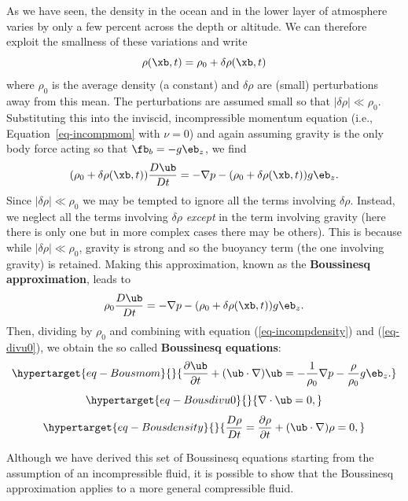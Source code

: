 \documentclass[
  letterpaper,
  twocolumn,
  landscape]{report}
\begin{document}
As we have seen, the density in the ocean and in the lower layer of
atmosphere varies by only a few percent across the depth or altitude. We
can therefore exploit the smallness of these variations and write \[
\rho(\xb,t) = \rho_0 + \delta\rho(\xb,t)
\] where \(\rho_0\) is the average density (a constant) and
\(\delta\rho\) are (small) perturbations away from this mean. The
perturbations are assumed small so that \(|\delta\rho|\ll\rho_0\).
Substituting this into the inviscid, incompressible momentum equation
(i.e., Equation~\ref{eq-incompmom} with \(\nu=0\)) and again assuming
gravity is the only body force acting so that \(\fb_b=-g\eb_z\), we find
\[
(\rho_0 + \delta\rho(\xb,t)) \frac{D\ub}{Dt} = -\nabla p - (\rho_0 + \delta\rho(\xb,t))g\eb_z.
\] Since \(|\delta\rho|\ll\rho_0\) we may be tempted to ignore all the
terms involving \(\delta\rho\). Instead, we neglect all the terms
involving \(\delta\rho\) \emph{except} in the term involving gravity
(here there is only one but in more complex cases there may be others).
This is because while \(|\delta\rho|\ll\rho_0\), gravity is strong and
so the buoyancy term (the one involving gravity) is retained. Making
this approximation, known as the \textbf{Boussinesq approximation},
leads to \[
\rho_0 \frac{D\ub}{Dt} = -\nabla p - (\rho_0 + \delta\rho(\xb,t))g\eb_z.
\] Then, dividing by \(\rho_0\) and combining with equation
(\ref{eq-incompdensity}) and (\ref{eq-divu0}), we obtain the so called
\textbf{Boussinesq equations}:
\begin{equation}\protect\hypertarget{eq-Bousmom}{}{\frac{\partial\ub}{\partial t} + (\ub\cdot\nabla)\ub = -\frac{1}{\rho_0}\nabla p -\frac{\rho}{\rho_0}g\eb_z. }\label{eq-Bousmom}\end{equation}
\begin{equation}\protect\hypertarget{eq-Bousdivu0}{}{ \nabla\cdot\ub = 0, }\label{eq-Bousdivu0}\end{equation}
\begin{equation}\protect\hypertarget{eq-Bousdensity}{}{\frac{D\rho}{Dt}  = \frac{\partial \rho}{\partial t} + (\ub\cdot\nabla)\rho= 0, }\label{eq-Bousdensity}\end{equation}

\begin{tcolorbox}[enhanced jigsaw, toprule=.15mm, left=2mm, opacityback=0, breakable, arc=.35mm, colback=white, rightrule=.15mm, bottomrule=.15mm, colframe=quarto-callout-note-color-frame, leftrule=.75mm]
\begin{minipage}[t]{5.5mm}
\textcolor{quarto-callout-note-color}{\faInfo}
\end{minipage}%
\begin{minipage}[t]{\textwidth - 5.5mm}

Although we have derived this set of Boussinesq equations starting from
the assumption of an incompressible fluid, it is possible to show that
the Boussinesq approximation applies to a more general compressible
fluid.

\end{minipage}%
\end{tcolorbox}
\end{document}
